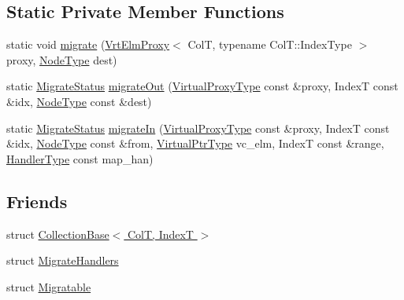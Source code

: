 \subsection*{Static Private Member Functions}
\begin{DoxyCompactItemize}
\item 
static void \hyperlink{structvt_1_1vrt_1_1collection_1_1_collection_elm_attorney_aa7e23dcc55cf4df77445b9795a32f44e}{migrate} (\hyperlink{structvt_1_1vrt_1_1collection_1_1_vrt_elm_proxy}{Vrt\+Elm\+Proxy}$<$ ColT, typename Col\+T\+::\+Index\+Type $>$ proxy, \hyperlink{namespacevt_a866da9d0efc19c0a1ce79e9e492f47e2}{Node\+Type} dest)
\item 
static \hyperlink{namespacevt_1_1vrt_1_1collection_ad221ad8aea9e586689b4335f5bcd9804}{Migrate\+Status} \hyperlink{structvt_1_1vrt_1_1collection_1_1_collection_elm_attorney_a672eb9e913410235692033f5b7ea24b5}{migrate\+Out} (\hyperlink{namespacevt_a1b417dd5d684f045bb58a0ede70045ac}{Virtual\+Proxy\+Type} const \&proxy, IndexT const \&idx, \hyperlink{namespacevt_a866da9d0efc19c0a1ce79e9e492f47e2}{Node\+Type} const \&dest)
\item 
static \hyperlink{namespacevt_1_1vrt_1_1collection_ad221ad8aea9e586689b4335f5bcd9804}{Migrate\+Status} \hyperlink{structvt_1_1vrt_1_1collection_1_1_collection_elm_attorney_ac25bab8e7671b6b8502ecd737213f122}{migrate\+In} (\hyperlink{namespacevt_a1b417dd5d684f045bb58a0ede70045ac}{Virtual\+Proxy\+Type} const \&proxy, IndexT const \&idx, \hyperlink{namespacevt_a866da9d0efc19c0a1ce79e9e492f47e2}{Node\+Type} const \&from, \hyperlink{structvt_1_1vrt_1_1collection_1_1_collection_elm_attorney_a36fe2c7f590baec1038c592db59a6315}{Virtual\+Ptr\+Type} vc\+\_\+elm, IndexT const \&range, \hyperlink{namespacevt_af64846b57dfcaf104da3ef6967917573}{Handler\+Type} const map\+\_\+han)
\end{DoxyCompactItemize}
\subsection*{Friends}
\begin{DoxyCompactItemize}
\item 
struct \hyperlink{structvt_1_1vrt_1_1collection_1_1_collection_elm_attorney_a4fb39ed9be2f0de84b237088ececde3f}{Collection\+Base$<$ Col\+T, Index\+T $>$}
\item 
struct \hyperlink{structvt_1_1vrt_1_1collection_1_1_collection_elm_attorney_af2ee449d95081faa04ebc6b8ae6516ed}{Migrate\+Handlers}
\item 
struct \hyperlink{structvt_1_1vrt_1_1collection_1_1_collection_elm_attorney_a5137563a7cb738979426be13c3089839}{Migratable}
\end{DoxyCompactItemize}


